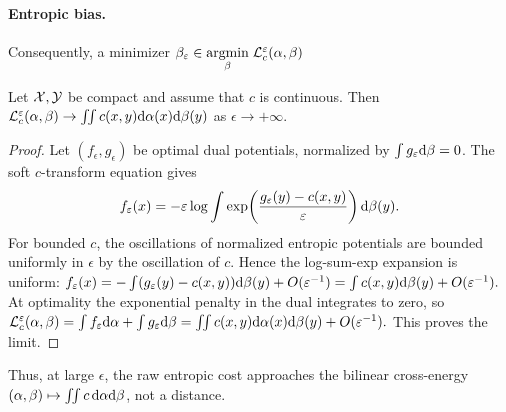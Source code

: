 \paragraph{Entropic bias.}
Consequently, a minimizer
\(\beta_\varepsilon\in\underset{\beta}{\operatorname{argmin}}\;\mathcal{L}_c^\varepsilon(\alpha,\beta)\)
\begin{prop}
Let $\mathcal{X},\mathcal{Y}$ be compact and assume that $c$ is continuous. Then $\mathcal{L}_c^\varepsilon(\alpha,\beta) \rightarrow \iint c(x,y)\mathrm{d}\alpha(x)\mathrm{d}\beta(y)$ as $\epsilon \rightarrow +\infty$.
\end{prop}
\begin{proof}
Let $(f_\epsilon,g_\epsilon)$ be optimal dual potentials, normalized by $\int g_\varepsilon\mathrm{d}\beta=0$. The soft $c$-transform equation gives
\[
f_\varepsilon(x)
=
-\varepsilon\log\int
\exp\!\left(\frac{g_\varepsilon(y)-c(x,y)}{\varepsilon}\right)\mathrm{d}\beta(y).
\]
For bounded $c$, the oscillations of normalized entropic potentials are bounded uniformly in $\epsilon$ by the oscillation of $c$. Hence the log-sum-exp expansion is uniform:
\(f_\varepsilon(x) = -\int (g_\varepsilon(y)-c(x,y))\mathrm{d}\beta(y)+O(\varepsilon^{-1}) = \int c(x,y)\mathrm{d}\beta(y)+O(\varepsilon^{-1}).\)
At optimality the exponential penalty in the dual integrates to zero, so
\(\mathcal{L}_c^\varepsilon(\alpha,\beta) = \int f_\varepsilon\mathrm{d}\alpha+\int g_\varepsilon\mathrm{d}\beta = \iint c(x,y)\mathrm{d}\alpha(x)\mathrm{d}\beta(y)+O(\varepsilon^{-1}).\)
This proves the limit.
\end{proof}
Thus, at large $\epsilon$, the raw entropic cost approaches the bilinear cross-energy $(\alpha,\beta)\mapsto\iint c\,\mathrm{d}\alpha\mathrm{d}\beta$, not a distance.

